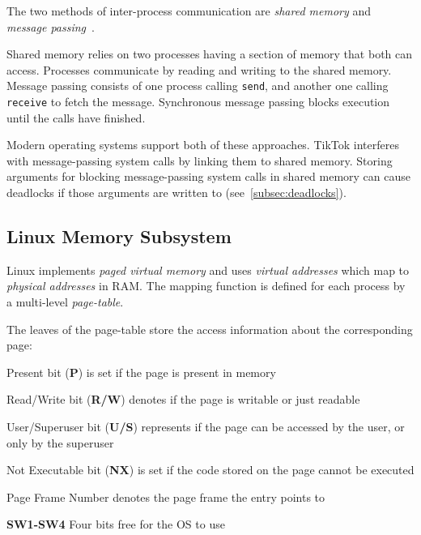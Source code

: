 \documentclass[conference]{IEEEtran}
\newcommand{\sysname}{TikTok}
\begin{document}
The two methods of inter-process communication are  \emph{shared memory} 
and \emph{message passing}~\cite{silberschatz2018operating}.

Shared memory relies on two processes having a section of memory that both can 
access. Processes communicate by reading and writing to the shared memory.
Message passing consists of one process calling \texttt{send}, and another one
calling \texttt{receive} to fetch the message. Synchronous message passing
blocks execution until the calls have finished.

Modern operating systems support both of these approaches. \sysname{} interferes
with message-passing system calls by linking them to shared memory. Storing
arguments for blocking message-passing system calls in shared memory can cause
deadlocks if those arguments are written to (see~\autoref{subsec:deadlocks}).

\subsection{Linux Memory Subsystem}
\label{subsec:vm}

Linux implements \emph{paged virtual memory} and uses \emph{virtual addresses}
which map to \emph{physical addresses} in RAM. The mapping function is defined
for each process by a multi-level \emph{page-table}.

The leaves of the page-table store the access information about the
corresponding page:
\begin{LaTeXdescription}
    \item[Present bit (\textbf{P})] is set if the page is present in memory
    \item[Read/Write bit (\textbf{R/W})] denotes if the page is writable or just
         readable
    \item[User/Superuser bit (\textbf{U/S})] represents if the page can be 
    accessed by the user, or only by the superuser
    \item[Not Executable bit (\textbf{NX})] is set if the code stored on the 
    page cannot be executed
    \item[Page Frame Number] denotes the page frame the entry points to
    \item[\textbf{SW1-SW4}] Four bits free for the OS to use
\end{LaTeXdescription}
\end{document}

